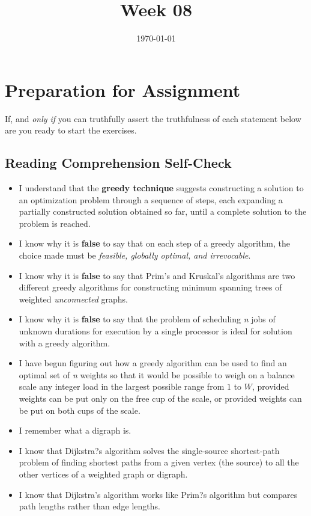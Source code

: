 \documentclass[12pt]{amsart}
\title{Week 08}
\date{\today}
\begin{document}
\maketitle

\section{Preparation for Assignment}
If, and \textit{only if} you can truthfully assert the truthfulness of each statement below are you ready to start the exercises.
\subsection {Reading Comprehension Self-Check}
\begin{itemize}
\item I understand that the \textbf{greedy technique} suggests constructing a solution to an optimization problem through a sequence of steps, each expanding a partially constructed solution obtained so far, until a complete solution to the problem is reached.
 \item I know why it is \textbf{false} to say that on each step of a greedy algorithm, the choice made must be \textit{feasible, globally optimal, and irrevocable}.
 \item I know why it is \textbf{false} to say that Prim\textquoteright{}s and Kruskal\textquoteright{}s algorithms are two different greedy algorithms for constructing minimum spanning trees of weighted \textit{unconnected} graphs.
 \item I know why it is \textbf{false} to say that the problem of scheduling \textit{n} jobs of unknown durations for execution by a single processor is ideal for solution with a greedy algorithm.
 \item I have begun figuring out how a greedy algorithm can be used to find an optimal set of \textit{n} weights so that it would be possible to weigh on a balance scale any integer load in the largest possible range from $1$ to $W$, provided weights can be put only on the free cup of the scale, or provided weights can be put on both cups of the scale.
 \item I remember what a digraph is.
 \item I know that Dijkstra?s algorithm solves the single-source shortest-path problem of finding shortest paths from a given vertex (the source) to all the other vertices of a weighted graph or digraph.
 \item I know that Dijkstra\textquoteright{}s algorithm works like Prim?s algorithm but compares path lengths rather than edge lengths.

\end{itemize}
\end{document}
